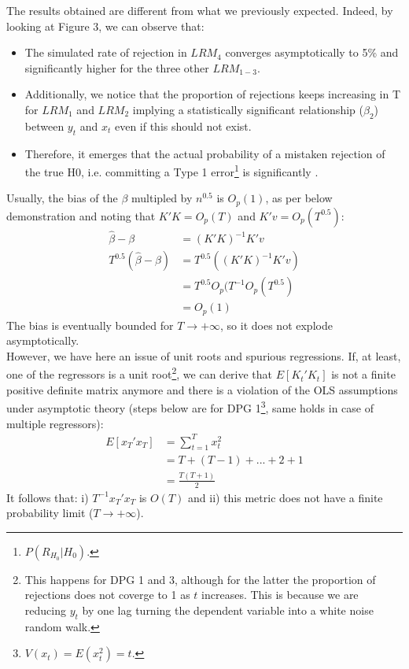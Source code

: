 \documentclass[]{article}
\begin{document}
The results obtained are different from what we previously expected. Indeed, by looking at Figure 3, we can observe that:
\begin{itemize}
	\item The simulated rate of rejection in $LRM_4$ converges asymptotically to 5\% and significantly higher for the three other $LRM_{1-3}$.
	\item Additionally, we notice that the proportion of rejections keeps increasing in T for $LRM_1$ and $LRM_2$ implying a statistically significant relationship ($\beta_2$) between $y_t$ and $x_t$ even if this should not exist.
	\item Therefore, it emerges that the actual probability of a mistaken rejection of the true H0, i.e. committing a Type 1 error\footnote{$P(R_{H_0}|H_0)$.} is significantly .
\end{itemize}
Usually, the bias of the $\beta$ multipled by $n^{0.5}$ is $O_{p}(1)$, as per below demonstration and noting that $K'K = O_{p}(T)$ and $K'v = O_{p}(T^{0.5})$:
\begin{align*}
	\hat{\beta} - \beta &= (K'K)^{-1}K'v \\
	T^{0.5}(\hat{\beta} - \beta) &= T^{0.5}((K'K)^{-1}K'v) \\
	&= T^{0.5}O_{p}(T^{-1}O_{p}(T^{0.5}) \\
	&= O_{p}(1)  
\end{align*}
The bias is eventually bounded for $T \to +\infty$, so it does not explode asymptotically.\\ 
However, we have here an issue of unit roots and spurious regressions. If, at least, one of the regressors is a unit root\footnote{This happens for DPG 1 and 3, although for the latter the proportion of rejections does not coverge to 1 as $t$ increases. This is because we are reducing $y_t$ by one lag turning the dependent variable into a white noise random walk.}, we can derive that $E[K_{t}'K_{t}]$ is not a finite positive definite matrix anymore and there is a violation of the OLS assumptions under asymptotic theory (steps below are for DPG 1\footnote{$V(x_t) = E(x_{t}^2) = t$.}, same holds in case of multiple regressors):
\begin{align*}
	E[x_{T}'x_{T}] &= \sum_{t=1}^{T}x_{t}^2 \\  
	&= T + (T-1) +...+2+1 \\
	&= \frac{T(T+1)}{2}
\end{align*}
It follows that: i) $T^{-1}x_{T}'x_{T}$ is $O(T)$ and ii) this metric does not have a finite probability limit ($T \to + \infty$). \\
\end{document}
